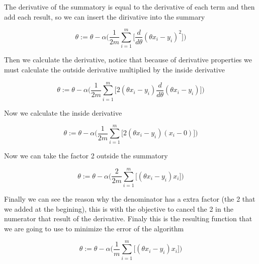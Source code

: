 \documentclass[12pt,journal]{IEEEtran}
\begin{document}
    The derivative of the summatory is equal to the derivative of each term and
    then add each result, so we can insert the dirivative into the summary

    \begin{equation}
        \theta := \theta - \alpha
            \Bigg(
                \frac{1}{2m} \sum_{i=1}^{m}
                    \Bigg[
                        \frac{d}{d \theta} (\theta x_i - y_i)^2
                    \Bigg]
            \Bigg)
    \end{equation}

    Then we calculate the derivative, notice that because of derivative
    properties we must calculate the outside derivative multiplied by the inside
    derivative

    \begin{equation}
        \theta := \theta - \alpha
            \Bigg(
                \frac{1}{2m} \sum_{i=1}^{m}
                    \Bigg[
                        2(\theta x_i - y_i) \frac{d}{d \theta}(\theta x_i - y_i)
                    \Bigg]
            \Bigg)
    \end{equation}

    Now we calculate the inside derivative

    \begin{equation}
        \theta := \theta - \alpha
            \Bigg(
                \frac{1}{2m} \sum_{i=1}^{m}
                    \Big[
                        2 (\theta x_i - y_i) (x_i - 0)
                    \Big]
            \Bigg)
    \end{equation}

    Now we can take the factor 2 outside the summatory

    \begin{equation}
        \theta := \theta - \alpha
            \Bigg(
                \frac{2}{2m} \sum_{i=1}^{m}
                    \Big[
                        (\theta x_i - y_i) x_i
                    \Big]
            \Bigg)
    \end{equation}

    Finally we can see the reason why the denominator has a extra factor
    (the 2 that we added at the begining), this is with the objective
    to cancel the 2 in the numerator that result of the derivative. Finaly
    this is the resulting function that we are going to use to minimize the
    error of the algorithm

    \begin{equation}
        \theta := \theta - \alpha
            \Bigg(
                \frac{1}{m} \sum_{i=1}^{m}
                    \Big[
                        (\theta x_i - y_i) x_i
                    \Big]
            \Bigg)
    \end{equation}
\end{document}
